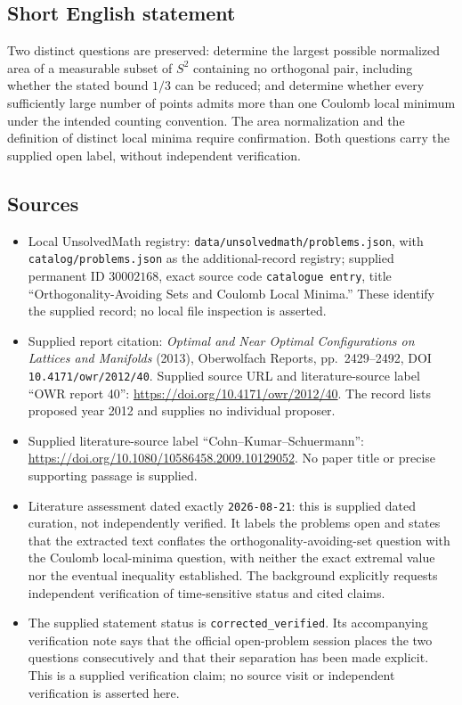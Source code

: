 \documentclass[11pt]{article}
\begin{document}
\subsection{Short English statement}
Two distinct questions are preserved: determine the largest possible normalized area of a measurable subset of \(S^2\) containing no orthogonal pair, including whether the stated bound \(1/3\) can be reduced; and determine whether every sufficiently large number of points admits more than one Coulomb local minimum under the intended counting convention. The area normalization and the definition of distinct local minima require confirmation. Both questions carry the supplied open label, without independent verification.
\subsection{Sources}
\begin{itemize}
\item Local UnsolvedMath registry: \texttt{data/unsolvedmath/problems.json}, with \texttt{catalog/problems.json} as the additional-record registry; supplied permanent ID \(30002168\), exact source code \texttt{catalogue entry}, title ``Orthogonality-Avoiding Sets and Coulomb Local Minima.'' These identify the supplied record; no local file inspection is asserted.
\item Supplied report citation: \emph{Optimal and Near Optimal Configurations on Lattices and Manifolds} (2013), Oberwolfach Reports, pp.\ 2429--2492, DOI \texttt{10.4171/owr/2012/40}. Supplied source URL and literature-source label ``OWR report 40'': \url{https://doi.org/10.4171/owr/2012/40}. The record lists proposed year 2012 and supplies no individual proposer.
\item Supplied literature-source label ``Cohn--Kumar--Schuermann'': \url{https://doi.org/10.1080/10586458.2009.10129052}. No paper title or precise supporting passage is supplied.
\item Literature assessment dated exactly \texttt{2026-08-21}: this is supplied dated curation, not independently verified. It labels the problems open and states that the extracted text conflates the orthogonality-avoiding-set question with the Coulomb local-minima question, with neither the exact extremal value nor the eventual inequality established. The background explicitly requests independent verification of time-sensitive status and cited claims.
\item The supplied statement status is \texttt{corrected\_verified}. Its accompanying verification note says that the official open-problem session places the two questions consecutively and that their separation has been made explicit. This is a supplied verification claim; no source visit or independent verification is asserted here.
\end{itemize}
\end{document}
